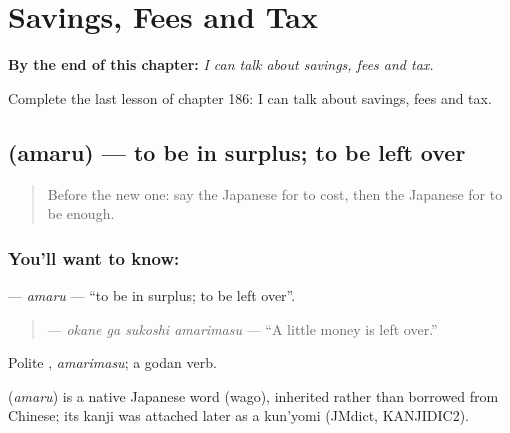 
\chapter{Savings, Fees and Tax}
\label{ch:ja-savings-fees-and-tax}

\begin{chapteropening}
\textbf{By the end of this chapter:} \emph{I can talk about savings, fees and tax.}

Complete the last lesson of chapter 186: I can talk about savings, fees and tax.
\end{chapteropening}

\section[\texorpdfstring{\ja{あまる} (amaru)}{あまる (amaru)}]{ (amaru) — to be in surplus; to be left over}

\label{lesson:JA-C186-amaru}



\begin{quote}
Before the new one: say the Japanese for to cost, then the Japanese for to be enough.
\end{quote}

\subsection*{You'll want to know: }
\textbf{} — \emph{amaru} — \textquotedblleft{}to be in surplus; to be left over\textquotedblright{}.

\begin{quote}
\textbf{  } — \emph{okane ga sukoshi amarimasu} — \textquotedblleft{}A little money is left over.\textquotedblright{}
\end{quote}

Polite \textbf{}, \emph{amarimasu}; a godan verb.

\begin{cousinweb}
\textbf{} (\emph{amaru}) is a native Japanese word (wago), inherited rather than borrowed from Chinese; its kanji was attached later as a kun'yomi (JMdict, KANJIDIC2).
\end{cousinweb}

